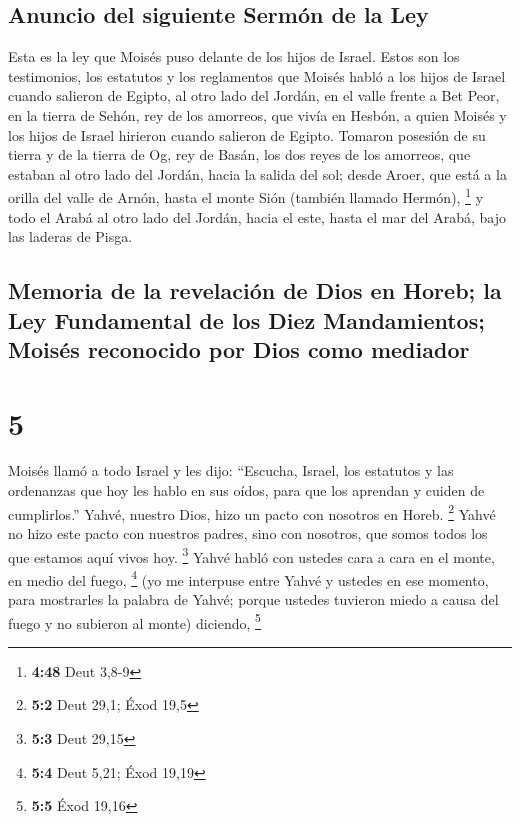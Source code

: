 \hypertarget{anuncio-del-siguiente-sermuxf3n-de-la-ley}{%
\subsection{Anuncio del siguiente Sermón de la
Ley}\label{anuncio-del-siguiente-sermuxf3n-de-la-ley}}

 Esta es la ley que Moisés puso delante de los hijos de
Israel.  Estos son los testimonios, los estatutos y los
reglamentos que Moisés habló a los hijos de Israel cuando salieron de
Egipto,  al otro lado del Jordán, en el valle frente a
Bet Peor, en la tierra de Sehón, rey de los amorreos, que vivía en
Hesbón, a quien Moisés y los hijos de Israel hirieron cuando salieron de
Egipto.  Tomaron posesión de su tierra y de la tierra de
Og, rey de Basán, los dos reyes de los amorreos, que estaban al otro
lado del Jordán, hacia la salida del sol;  desde Aroer,
que está a la orilla del valle de Arnón, hasta el monte Sión (también
llamado Hermón), \footnote{\textbf{4:48} Deut 3,8-9}  y
todo el Arabá al otro lado del Jordán, hacia el este, hasta el mar del
Arabá, bajo las laderas de Pisga.

\hypertarget{memoria-de-la-revelaciuxf3n-de-dios-en-horeb-la-ley-fundamental-de-los-diez-mandamientos-moisuxe9s-reconocido-por-dios-como-mediador}{%
\subsection{Memoria de la revelación de Dios en Horeb; la Ley
Fundamental de los Diez Mandamientos; Moisés reconocido por Dios como
mediador}\label{memoria-de-la-revelaciuxf3n-de-dios-en-horeb-la-ley-fundamental-de-los-diez-mandamientos-moisuxe9s-reconocido-por-dios-como-mediador}}

\hypertarget{section-4}{%
\section{5}\label{section-4}}

 Moisés llamó a todo Israel y les dijo: ``Escucha, Israel,
los estatutos y las ordenanzas que hoy les hablo en sus oídos, para que
los aprendan y cuiden de cumplirlos.''  Yahvé, nuestro
Dios, hizo un pacto con nosotros en Horeb. \footnote{\textbf{5:2} Deut
  29,1; Éxod 19,5}  Yahvé no hizo este pacto con nuestros
padres, sino con nosotros, que somos todos los que estamos aquí vivos
hoy. \footnote{\textbf{5:3} Deut 29,15}  Yahvé habló con
ustedes cara a cara en el monte, en medio del fuego, \footnote{\textbf{5:4}
  Deut 5,21; Éxod 19,19}  (yo me interpuse entre Yahvé y
ustedes en ese momento, para mostrarles la palabra de Yahvé; porque
ustedes tuvieron miedo a causa del fuego y no subieron al monte)
diciendo, \footnote{\textbf{5:5} Éxod 19,16}

